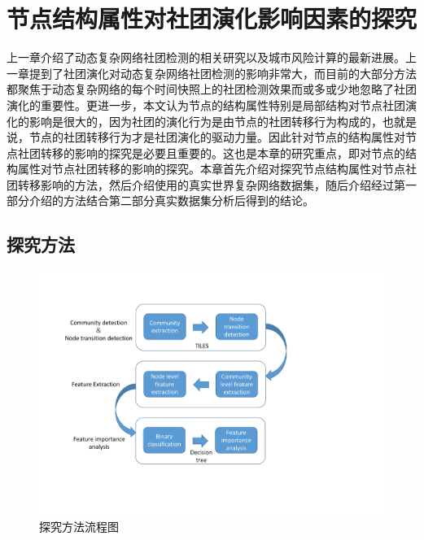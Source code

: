 
\chapter{节点结构属性对社团演化影响因素的探究}
上一章介绍了动态复杂网络社团检测的相关研究以及城市风险计算的最新进展。上一章提到了社团演化对动态复杂网络社团检测的影响非常大，而目前的大部分方法都聚焦于动态复杂网络的每个时间快照上的社团检测效果而或多或少地忽略了社团演化的重要性。更进一步，本文认为节点的结构属性特别是局部结构对节点社团演化的影响是很大的，因为社团的演化行为是由节点的社团转移行为构成的，也就是说，节点的社团转移行为才是社团演化的驱动力量。因此针对节点的结构属性对节点社团转移的影响的探究是必要且重要的。这也是本章的研究重点，即对节点的结构属性对节点社团转移的影响的探究。本章首先介绍对探究节点结构属性对节点社团转移影响的方法，然后介绍使用的真实世界复杂网络数据集，随后介绍经过第一部分介绍的方法结合第二部分真实数据集分析后得到的结论。
\section{探究方法}

\begin{figure}[!htbp]
	\setlength{\abovecaptionskip}{0pt} 
	\setlength{\belowcaptionskip}{10pt} 
	\includegraphics[width=.9\textwidth]{./figure/flowChart3.pdf}
	\caption{探究方法流程图}
	\label{fig.3.1}
\end{figure}

